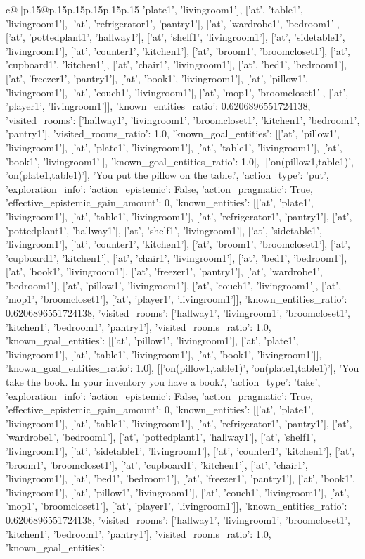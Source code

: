 \documentclass{article}
\begin{document}
{\begin{supertabular}{c@{$\;$}|p{.15\linewidth}@{}p{.15\linewidth}p{.15\linewidth}p{.15\linewidth}p{.15\linewidth}p{.15\linewidth}}
{{{'plate1', 'livingroom1'], ['at', 'table1', 'livingroom1'], ['at', 'refrigerator1', 'pantry1'], ['at', 'wardrobe1', 'bedroom1'], ['at', 'pottedplant1', 'hallway1'], ['at', 'shelf1', 'livingroom1'], ['at', 'sidetable1', 'livingroom1'], ['at', 'counter1', 'kitchen1'], ['at', 'broom1', 'broomcloset1'], ['at', 'cupboard1', 'kitchen1'], ['at', 'chair1', 'livingroom1'], ['at', 'bed1', 'bedroom1'], ['at', 'freezer1', 'pantry1'], ['at', 'book1', 'livingroom1'], ['at', 'pillow1', 'livingroom1'], ['at', 'couch1', 'livingroom1'], ['at', 'mop1', 'broomcloset1'], ['at', 'player1', 'livingroom1']], 'known_entities_ratio': 0.6206896551724138, 'visited_rooms': ['hallway1', 'livingroom1', 'broomcloset1', 'kitchen1', 'bedroom1', 'pantry1'], 'visited_rooms_ratio': 1.0, 'known_goal_entities': [['at', 'pillow1', 'livingroom1'], ['at', 'plate1', 'livingroom1'], ['at', 'table1', 'livingroom1'], ['at', 'book1', 'livingroom1']], 'known_goal_entities_ratio': 1.0}}], [['on(pillow1,table1)', 'on(plate1,table1)'], 'You put the pillow on the table.', {'action_type': 'put', 'exploration_info': {'action_epistemic': False, 'action_pragmatic': True, 'effective_epistemic_gain_amount': 0, 'known_entities': [['at', 'plate1', 'livingroom1'], ['at', 'table1', 'livingroom1'], ['at', 'refrigerator1', 'pantry1'], ['at', 'pottedplant1', 'hallway1'], ['at', 'shelf1', 'livingroom1'], ['at', 'sidetable1', 'livingroom1'], ['at', 'counter1', 'kitchen1'], ['at', 'broom1', 'broomcloset1'], ['at', 'cupboard1', 'kitchen1'], ['at', 'chair1', 'livingroom1'], ['at', 'bed1', 'bedroom1'], ['at', 'book1', 'livingroom1'], ['at', 'freezer1', 'pantry1'], ['at', 'wardrobe1', 'bedroom1'], ['at', 'pillow1', 'livingroom1'], ['at', 'couch1', 'livingroom1'], ['at', 'mop1', 'broomcloset1'], ['at', 'player1', 'livingroom1']], 'known_entities_ratio': 0.6206896551724138, 'visited_rooms': ['hallway1', 'livingroom1', 'broomcloset1', 'kitchen1', 'bedroom1', 'pantry1'], 'visited_rooms_ratio': 1.0, 'known_goal_entities': [['at', 'pillow1', 'livingroom1'], ['at', 'plate1', 'livingroom1'], ['at', 'table1', 'livingroom1'], ['at', 'book1', 'livingroom1']], 'known_goal_entities_ratio': 1.0}}], [['on(pillow1,table1)', 'on(plate1,table1)'], 'You take the book. In your inventory you have a book.', {'action_type': 'take', 'exploration_info': {'action_epistemic': False, 'action_pragmatic': True, 'effective_epistemic_gain_amount': 0, 'known_entities': [['at', 'plate1', 'livingroom1'], ['at', 'table1', 'livingroom1'], ['at', 'refrigerator1', 'pantry1'], ['at', 'wardrobe1', 'bedroom1'], ['at', 'pottedplant1', 'hallway1'], ['at', 'shelf1', 'livingroom1'], ['at', 'sidetable1', 'livingroom1'], ['at', 'counter1', 'kitchen1'], ['at', 'broom1', 'broomcloset1'], ['at', 'cupboard1', 'kitchen1'], ['at', 'chair1', 'livingroom1'], ['at', 'bed1', 'bedroom1'], ['at', 'freezer1', 'pantry1'], ['at', 'book1', 'livingroom1'], ['at', 'pillow1', 'livingroom1'], ['at', 'couch1', 'livingroom1'], ['at', 'mop1', 'broomcloset1'], ['at', 'player1', 'livingroom1']], 'known_entities_ratio': 0.6206896551724138, 'visited_rooms': ['hallway1', 'livingroom1', 'broomcloset1', 'kitchen1', 'bedroom1', 'pantry1'], 'visited_rooms_ratio': 1.0, 'known_goal_entities': }}}
\end{supertabular}}
\end{document}
